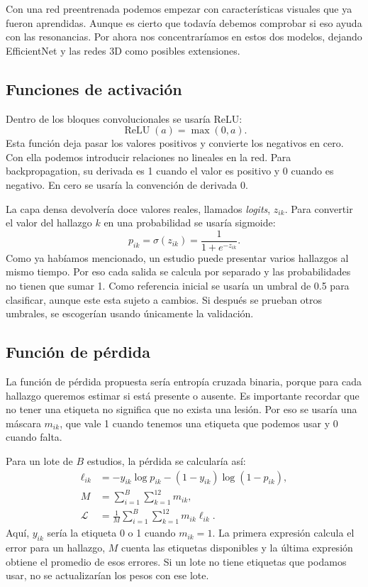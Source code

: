 \documentclass[eng]{ajceam-class}
\begin{document}
Con una red preentrenada podemos empezar con características visuales que ya fueron aprendidas. Aunque es cierto que todavía debemos comprobar si eso ayuda con las resonancias. Por ahora nos concentraríamos en estos dos modelos, dejando EfficientNet y las redes 3D como posibles extensiones.

\subsection{Funciones de activación}

Dentro de los bloques convolucionales se usaría ReLU:
\begin{equation}
\operatorname{ReLU}(a)=\max(0,a).
\end{equation}
Esta función deja pasar los valores positivos y convierte los negativos en cero. Con ella podemos introducir relaciones no lineales en la red. Para backpropagation, su derivada es 1 cuando el valor es positivo y 0 cuando es negativo. En cero se usaría la convención de derivada 0.

La capa densa devolvería doce valores reales, llamados \textit{logits}, $z_{ik}$. Para convertir el valor del hallazgo $k$ en una probabilidad se usaría sigmoide:
\begin{equation}
p_{ik}=\sigma(z_{ik})=\frac{1}{1+e^{-z_{ik}}}.
\end{equation}
Como ya habíamos mencionado, un estudio puede presentar varios hallazgos al mismo tiempo. Por eso cada salida se calcula por separado y las probabilidades no tienen que sumar 1. Como referencia inicial se usaría un umbral de 0.5 para clasificar, aunque este esta sujeto a cambios. Si después se prueban otros umbrales, se escogerían usando únicamente la validación.

\subsection{Función de pérdida}

La función de pérdida propuesta sería entropía cruzada binaria, porque para cada hallazgo queremos estimar si está presente o ausente. Es importante recordar que no tener una etiqueta no significa que no exista una lesión. Por eso se usaría una máscara $m_{ik}$, que vale 1 cuando tenemos una etiqueta que podemos usar y 0 cuando falta.

Para un lote de $B$ estudios, la pérdida se calcularía así:
\begin{align}
\ell_{ik} &=-y_{ik}\log p_{ik}
            -(1-y_{ik})\log(1-p_{ik}),\\
M &= \sum_{i=1}^{B}\sum_{k=1}^{12}m_{ik},\\
\mathcal{L} &= \frac{1}{M}
\sum_{i=1}^{B}\sum_{k=1}^{12}m_{ik}\ell_{ik}.
\end{align}
Aquí, $y_{ik}$ sería la etiqueta 0 o 1 cuando $m_{ik}=1$. La primera expresión calcula el error para un hallazgo, $M$ cuenta las etiquetas disponibles y la última expresión obtiene el promedio de esos errores. Si un lote no tiene etiquetas que podamos usar, no se actualizarían los pesos con ese lote.
\end{document}

